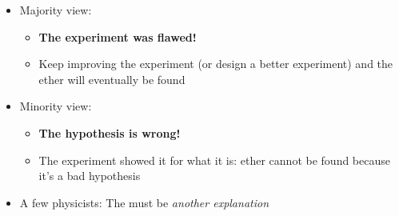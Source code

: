 \begin{itemize}
\item Majority view:
  \begin{itemize}
  \item\textbf{The experiment was flawed!}
  \item Keep improving the experiment (or design a better experiment) and the
    ether will eventually be found
  \end{itemize}
\item Minority view:
  \begin{itemize}
  \item\textbf{The hypothesis is wrong!}
  \item The experiment showed it for what it is: ether cannot be found
    because it's a bad hypothesis
  \end{itemize}
\item A few physicists: The must be \emph{another explanation}
\end{itemize}
%
%
%
%
%  
%
%      
%
%  
%
%
%
%
